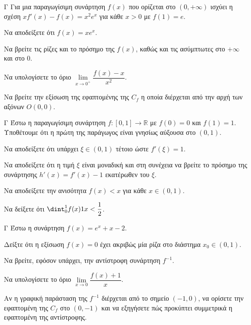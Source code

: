 \begin{thema}{Γ}
Για μια παραγωγίσιμη συνάρτηση $f(x)$ που ορίζεται στο $(0, +\infty)$ ισχύει η σχέση $x f'(x) - f(x) = x^2 e^x$ για κάθε $x > 0$ με $f(1) = e$.
\begin{erwthma}
  \item Να αποδείξετε ότι $f(x) = x e^x$.
  \item Να βρείτε τις ρίζες και το πρόσημο της $f(x)$, καθώς και τις ασύμπτωτες στο $+\infty$ και στο $0$.
  \item Να υπολογίσετε το όριο $\lim\limits_{x \to 0^+} \dfrac{f(x) - x}{x^2}$.
  \item Να βρείτε την εξίσωση της εφαπτομένης της $C_f$ η οποία διέρχεται από την αρχή των αξόνων $O(0,0)$.
\end{erwthma}
\end{thema}

\begin{thema}{Γ}
Έστω η παραγωγίσιμη συνάρτηση $f: [0, 1] \to \mathbb{R}$ με $f(0) = 0$ και $f(1) = 1$. Υποθέτουμε ότι η πρώτη της παράγωγος είναι γνησίως αύξουσα στο $(0,1)$.
\begin{erwthma}
  \item Να αποδείξετε ότι υπάρχει $\xi \in (0, 1)$ τέτοιο ώστε $f'(\xi) = 1$.
  \item Να αποδείξετε ότι η τιμή $\xi$ είναι μοναδική και στη συνέχεια να βρείτε το πρόσημο της συνάρτησης $h'(x) = f'(x) - 1$ εκατέρωθεν του $\xi$.
  \item Να αποδείξετε την ανισότητα $f(x) < x$ για κάθε $x \in (0, 1)$.
  \item Να δείξετε ότι $\dint_0^1 f(x)\d x < \dfrac{1}{2}$.
\end{erwthma}
\end{thema}

\begin{thema}{Γ}
Έστω η συνάρτηση $f(x) = e^x + x - 2$.
\begin{erwthma}
  \item Δείξτε ότι η εξίσωση $f(x) = 0$ έχει ακριβώς μία ρίζα στο διάστημα $x_0\in(0, 1)$.
  \item Να βρείτε, εφόσον υπάρχει, την αντίστροφη συνάρτηση $f^{-1}$.
  \item Να υπολογίσετε το όριο $\lim\limits_{x \to 0} \dfrac{f(x) + 1}{x}$.
  \item Αν η γραφική παράσταση της $f^{-1}$ διέρχεται από το σημείο $(-1, 0)$, να ορίσετε την εφαπτομένη της $C_f$ στο $(0, -1)$ και να εξηγήσετε πώς προκύπτει συμμετρικά η εφαπτομένη της αντίστροφης.
\end{erwthma}
\end{thema}

